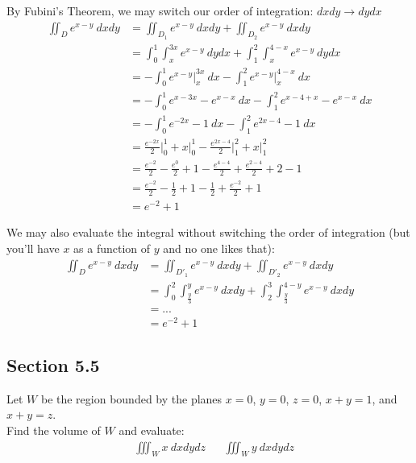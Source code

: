 \begin{solution}
    By Fubini's Theorem, we may switch our order of integration: \(dxdy \rightarrow dydx\)
    \begin{align*}
        \iint_D e^{x-y} \ dxdy &= \iint_{D_1} e^{x-y} \ dxdy + \iint_{D_2} e^{x-y} \ dxdy \\
        &= \int_0^1 \int_x^{3x} e^{x-y} \ dydx + \int_1^2 \int_x^{4 - x} e^{x-y} \ dydx \\
        &= - \int_0^1 e^{x-y} \Big|_x^{3x} \ dx - \int_1^2 e^{x-y}\Big|_x^{4 - x} \ dx \\
        &= - \int_0^1 e^{x-3x} - e^{x-x} \ dx - \int_1^2 e^{x- 4 + x} - e^{x-x} \ dx \\
        &= - \int_0^1 e^{-2x} - 1 \ dx - \int_1^2 e^{2x - 4} - 1 \ dx \\
        &= \frac{e^{-2x}}{2}\Biggr|_0^1 + x\Big|_0^1 - \frac{e^{2x - 4}}{2}\Biggr|_1^2 + x\Big|_1^2 \\
        &= \frac{e^{-2}}{2} - \frac{e^0}{2} + 1 - \frac{e^{4 - 4}}{2} + \frac{e^{2 - 4}}{2} + 2 - 1 \\
        &= \frac{e^{-2}}{2} - \frac{1}{2} + 1 - \frac{1}{2} + \frac{e^{-2}}{2} + 1 \\
        &= e^{-2} + 1
    \end{align*}
    
    We may also evaluate the integral without switching the order of integration (but you'll have \(x\) as a function of \(y\) and no one likes that):
    \begin{align*}
        \iint_D e^{x-y} \ dxdy &= \iint_{D'_1} e^{x-y} \ dxdy + \iint_{D'_2} e^{x-y} \ dxdy \\
        &= \int_0^2 \int_{\frac{y}{3}}^{y} e^{x-y} \ dxdy + \int_2^3 \int_{\frac{y}{3}}^{4 - y} e^{x-y} \ dxdy \\
        &= ... \\
        &= e^{-2} + 1
    \end{align*}
\end{solution}

\subsection{Section 5.5}

\begin{tcolorbox}[
        title={Problem 30 (a)},
        valign=center,
        nobeforeafter,
        colframe=gray!95!black
    ]
    
    Let \(W\) be the region bounded by the planes \(x = 0\), \(y = 0\), \(z = 0\), \(x + y = 1\), and \(x + y = z\). \\
    
    Find the volume of \(W\) and evaluate:
    \begin{align}
        &\iiint_W x \ dxdydz & &\iiint_W y \ dxdydz
    \end{align}
\end{tcolorbox}

